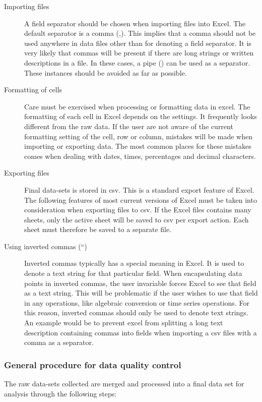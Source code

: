 \documentclass{nwureport}
\begin{document}
\begin{description}
\item [Importing files] A field separator should be chosen when
  importing files into Excel. The default separator is a comma
  (,). This implies that a comma should not be used anywhere in data
  files other than for denoting a field separator. It is very likely
  that commas will be present if there are long strings or written
  descriptions in a file. In these cases, a pipe (\textbar) can be used as a
  separator. These instances should be avoided as far as possible.
\item [Formatting of cells] Care must be exercised when processing or
  formatting data in excel. The formatting of each cell in Excel
  depends on the settings. It frequently looks different from the raw
  data. If the user are not aware of the current formatting setting of
  the cell, row or column, mistakes will be made when importing or
  exporting data. The most common places for these mistakes comes when
  dealing with dates, times, percentages and decimal characters.
\item [Exporting files] Final data-sets is stored in \gls{csv}. This is
  a standard export feature of Excel. The following features of most
  current versions of Excel must be taken into consideration when
  exporting files to \gls{csv}. If the Excel files contains many
  sheets, only the active sheet will be saved to \gls{csv} per export
  action. Each sheet must therefore be saved to a separate file.
\item [Using inverted commas (``)] Inverted commas typically has a
  special meaning in Excel. It is used to denote a text string for
  that particular field. When encapsulating data points in inverted
  commas, the user invariable forces Excel to see that field as a text
  string. This will be problematic if the user wishes to use that
  field in any operations, like algebraic conversion or time series
  operations. For this reason, inverted commas should only be used to
  denote text strings. An example would be to prevent excel from splitting a
  long text description containing commas into fields when importing a
  \gls{csv} files with a comma as a separator.
\end{description}

\subsubsection{General procedure for data quality control}
The raw data-sets collected are merged and processed into a final data
set for analysis through the following steps:
\end{document}
